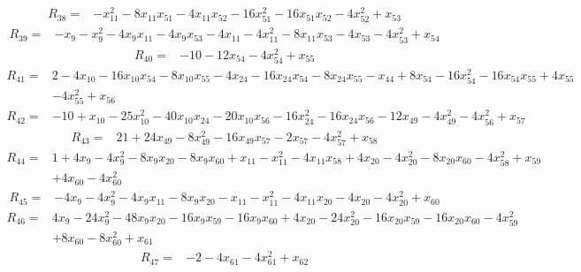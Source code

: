 \begin{align*}
R_{38}={}&-x_{11}^{2}-8x_{11}x_{51}-4x_{11}x_{52}-16x_{51}^{2}-16x_{51}x_{52}-4x_{52}^{2}+x_{53}
\end{align*}
\begin{align*}
R_{39}={}&-x_{9}-x_{9}^{2}-4x_{9}x_{11}-4x_{9}x_{53}-4x_{11}-4x_{11}^{2}-8x_{11}x_{53}-4x_{53}-4x_{53}^{2}+x_{54}
\end{align*}
\begin{align*}
R_{40}={}&-10-12x_{54}-4x_{54}^{2}+x_{55}
\end{align*}
\begin{align*}
R_{41}={}&2-4x_{10}-16x_{10}x_{54}-8x_{10}x_{55}-4x_{24}-16x_{24}x_{54}-8x_{24}x_{55}-x_{44}+8x_{54}-16x_{54}^{2}-16x_{54}x_{55}+4x_{55}\\
{}&-4x_{55}^{2}+x_{56}
\end{align*}
\begin{align*}
R_{42}={}&-10+x_{10}-25x_{10}^{2}-40x_{10}x_{24}-20x_{10}x_{56}-16x_{24}^{2}-16x_{24}x_{56}-12x_{49}-4x_{49}^{2}-4x_{56}^{2}+x_{57}
\end{align*}
\begin{align*}
R_{43}={}&21+24x_{49}-8x_{49}^{2}-16x_{49}x_{57}-2x_{57}-4x_{57}^{2}+x_{58}
\end{align*}
\begin{align*}
R_{44}={}&1+4x_{9}-4x_{9}^{2}-8x_{9}x_{20}-8x_{9}x_{60}+x_{11}-x_{11}^{2}-4x_{11}x_{58}+4x_{20}-4x_{20}^{2}-8x_{20}x_{60}-4x_{58}^{2}+x_{59}\\
{}&+4x_{60}-4x_{60}^{2}
\end{align*}
\begin{align*}
R_{45}={}&-4x_{9}-4x_{9}^{2}-4x_{9}x_{11}-8x_{9}x_{20}-x_{11}-x_{11}^{2}-4x_{11}x_{20}-4x_{20}-4x_{20}^{2}+x_{60}
\end{align*}
\begin{align*}
R_{46}={}&4x_{9}-24x_{9}^{2}-48x_{9}x_{20}-16x_{9}x_{59}-16x_{9}x_{60}+4x_{20}-24x_{20}^{2}-16x_{20}x_{59}-16x_{20}x_{60}-4x_{59}^{2}\\
{}&+8x_{60}-8x_{60}^{2}+x_{61}
\end{align*}
\begin{align*}
R_{47}={}&-2-4x_{61}-4x_{61}^{2}+x_{62}
\end{align*}
